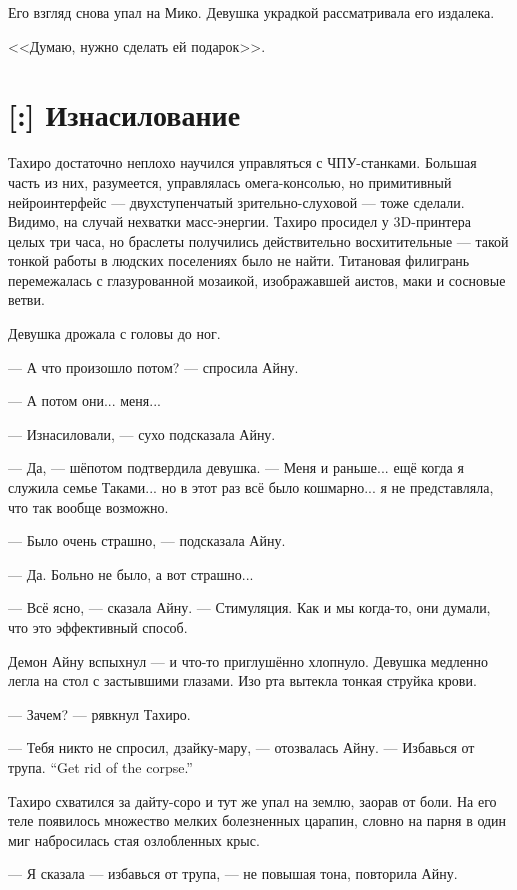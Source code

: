 Его взгляд снова упал на Мико.
Девушка украдкой рассматривала его издалека.

<<Думаю, нужно сделать ей подарок>>.

\section{[:] Изнасилование}

Тахиро достаточно неплохо научился управляться с ЧПУ-станками.
Большая часть из них, разумеется, управлялась омега-консолью, но примитивный нейроинтерфейс --- двухступенчатый зрительно-слуховой --- тоже сделали.
Видимо, на случай нехватки масс-энергии.
Тахиро просидел у 3D-принтера целых три часа, но браслеты получились действительно восхитительные --- такой тонкой работы в людских поселениях было не найти.
Титановая филигрань перемежалась с глазурованной мозаикой, изображавшей аистов, маки и сосновые ветви.

\textspace

Девушка дрожала с головы до ног.

--- А что произошло потом? --- спросила Айну.

--- А потом они... меня...

--- Изнасиловали, --- сухо подсказала Айну.

--- Да, --- шёпотом подтвердила девушка.
--- Меня и раньше... ещё когда я служила семье Таками... но в этот раз всё было кошмарно... я не представляла, что так вообще возможно.

--- Было очень страшно, --- подсказала Айну.

--- Да.
Больно не было, а вот страшно...

--- Всё ясно, --- сказала Айну.
--- Стимуляция.
Как и мы когда-то, они думали, что это эффективный способ.

Демон Айну вспыхнул --- и что-то приглушённо хлопнуло.
Девушка медленно легла на стол с застывшими глазами.
Изо рта вытекла тонкая струйка крови.

--- Зачем? --- рявкнул Тахиро.

--- Тебя никто не спросил, дзайку-мару, --- отозвалась Айну.
{--- Избавься от трупа.}
{``Get rid of the corpse.''}

Тахиро схватился за дайту-соро и тут же упал на землю, заорав от боли.
На его теле появилось множество мелких болезненных царапин, словно на парня в один миг набросилась стая озлобленных крыс.

--- Я сказала --- избавься от трупа, --- не повышая тона, повторила Айну.


